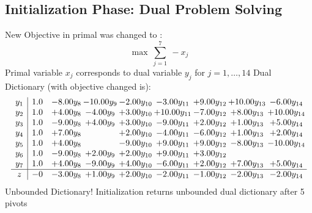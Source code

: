 \documentclass[8pt]{article}
\begin{document}
\subsection{Initialization Phase: Dual Problem Solving}
New Objective in primal was changed to : \[ \max\ \sum_{j=1}^{7}\ - x_j \] 
Primal variable $x_j$ corresponds to dual variable $y_j$ for $j = 1,\ldots,14$
Dual Dictionary (with objective changed is): 
\[\begin{array}{c| c c@{\hskip 2pt} c@{\hskip 2pt} c@{\hskip 2pt} c@{\hskip 2pt} c@{\hskip 2pt} c@{\hskip 2pt} c@{\hskip 2pt} }
 y_{1}   &  1.0 & -8.00 y_{8} & -10.00 y_{9} & -2.00 y_{10} & -3.00 y_{11} & +  9.00 y_{12} & + 10.00 y_{13} & -6.00 y_{14}\\
 y_{2}   &  1.0 & +  4.00 y_{8} & -4.00 y_{9} & +  3.00 y_{10} & + 10.00 y_{11} & -7.00 y_{12} & +  8.00 y_{13} & + 10.00 y_{14}\\
 y_{3}   &  1.0 & -9.00 y_{8} & +  4.00 y_{9} & +  3.00 y_{10} & -9.00 y_{11} & +  2.00 y_{12} & +  1.00 y_{13} & +  5.00 y_{14}\\
 y_{4}   &  1.0 & +  7.00 y_{8} &   & +  2.00 y_{10} & -4.00 y_{11} & -6.00 y_{12} & +  1.00 y_{13} & +  2.00 y_{14}\\
 y_{5}   &  1.0 & +  4.00 y_{8} &   & -9.00 y_{10} & +  9.00 y_{11} & +  9.00 y_{12} & -8.00 y_{13} & -10.00 y_{14}\\
 y_{6}   &  1.0 & -9.00 y_{8} & +  2.00 y_{9} & +  2.00 y_{10} & +  9.00 y_{11} & +  3.00 y_{12} &    &   \\
 y_{7}   &  1.0 & +  4.00 y_{8} & -9.00 y_{9} & +  4.00 y_{10} & -6.00 y_{11} & +  2.00 y_{12} & +  7.00 y_{13} & +  5.00 y_{14}\\
\hline
z    &  -0 & -3.00 y_{8} & +  1.00 y_{9} & +  2.00 y_{10} & -2.00 y_{11} & -1.00 y_{12} & -2.00 y_{13} & -2.00 y_{14}\\
\end{array}\]
Unbounded Dictionary!
Initialization returns unbounded dual dictionary after 5 pivots
\end{document}

